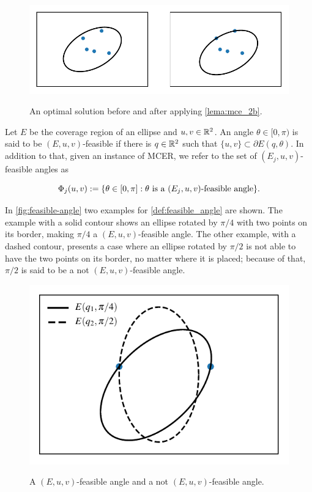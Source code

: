 \begin{figure}
	\centering
	\caption{An optimal solution before and after applying \autoref{lema:mce_2b}.}
	\includegraphics{tex/figures/scripts/ellipse-2-points}
	\fautor
	\label{fig:ellipse-2-points}
\end{figure}

\begin{definicao}\label{def:feasible_angle}
	Let $E$ be the coverage region of an ellipse and $u, v \in \mathbb{R}^2$. An angle $\theta \in [0, \pi)$ is said to be $(E, u, v)$-feasible if there is $q \in \mathbb{R}^2$ such that $\{u, v\} \subset \partial E(q, \theta)$.
	In addition to that, given an instance of MCER, we refer to the set of $(E_j, u, v)$-feasible angles as 
	
	\begin{equation}
	\Phi_j(u, v) := \{\theta \in [0, \pi] : \theta \textnormal{ is a } (E_j,u,v)\textnormal{-feasible angle}\}.
	\end{equation}
\end{definicao}

In \autoref{fig:feasible-angle} two examples for \autoref{def:feasible_angle} are shown. The example with a solid contour shows an ellipse rotated by $\pi/4$ with two points on its border, making $\pi/4$ a $(E, u, v)$-feasible angle.
The other example, with a dashed contour, presents a case where an ellipse rotated by $\pi/2$ is not able to have the two points on its border, no matter where it is placed; because of that, $\pi/2$ is said to be a not $(E, u, v)$-feasible angle.

\begin{figure}[H]
	\centering
	\caption{A $(E, u, v)$-feasible angle and a not $(E, u, v)$-feasible angle.}
	\includegraphics[scale=.8]{tex/figures/scripts/feasible-angle}
	\fautor
	\label{fig:feasible-angle}
\end{figure}

